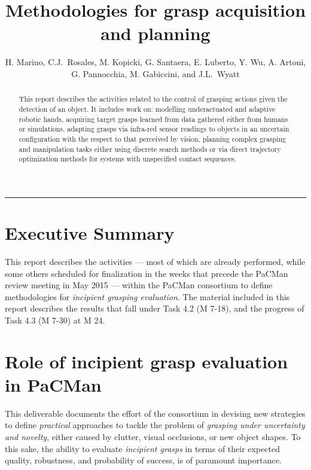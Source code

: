 \documentclass[a4paper,11pt,pdf]{pacmanreport}
\title{Methodologies for grasp acquisition and planning}
\author{H. Marino, C.J.~Rosales, M. Kopicki, G. Santaera, E. Luberto, Y. Wu, A. Artoni, G. Pannocchia, M. Gabiccini, and J.L.~Wyatt}
\begin{document}
\maketitle

\begin{abstract}
\noindent This report describes the activities related to the control of grasping actions given the detection of an object. It includes work on: modelling underactuated and adaptive robotic hands, acquiring target grasps learned from data gathered either from humans or simulations, adapting grasps via infra-red sensor readings to objects in an uncertain configuration with the respect to that perceived by vision, planning complex grasping and manipulation tasks either using discrete search methods or via direct trajectory optimization methods for systems with unspecified contact sequences.
\end{abstract}


\vspace{.2em}
\hrule

\footnotesize

\tableofcontents

\normalsize

\newpage

\section*{Executive Summary}

This report describes the activities --- most of which are already performed, while some others scheduled for finalization in the weeks that precede the PaCMan review meeting in May 2015 --- within the PaCMan consortium to define methodologies for \emph{incipient grasping evaluation}. The material included in this report describes the results that fall under Task 4.2 (M 7-18), and the progress of Task 4.3 (M 7-30) at M 24.

\section*{Role of incipient grasp evaluation in PaCMan}

This deliverable documents the effort of the consortium in devising new strategies to define \emph{practical} approaches to tackle the problem of \emph{grasping under uncertainty and novelty}, either caused by clutter, visual occlusions, or new object shapes. To this sake, the ability to evaluate \emph{incipient grasps} in terms of their expected quality, robustness, and probability of success, is of paramount importance.
\end{document}
